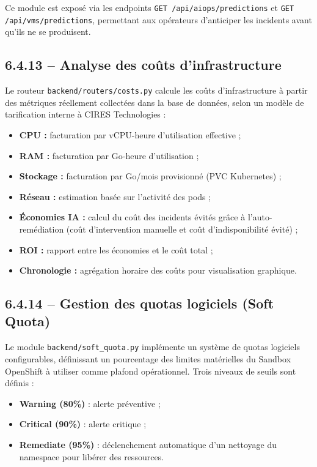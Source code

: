 \documentclass[11pt,a4paper]{report}
\begin{document}
Ce module est exposé via les endpoints \texttt{GET /api/aiops/predictions}
et \texttt{GET /api/vms/predictions}, permettant aux opérateurs d'anticiper
les incidents avant qu'ils ne se produisent.

\subsection*{6.4.13 -- Analyse des coûts d'infrastructure}

Le routeur \texttt{backend/routers/costs.py} calcule les coûts
d'infrastructure à partir des métriques réellement collectées dans la base
de données, selon un modèle de tarification interne à CIRES Technologies :

\begin{itemize}[label=\textbullet, leftmargin=1.5cm, labelsep=0.5cm,
                itemsep=0.1em, parsep=0em, topsep=0.2em]
    \item \textbf{CPU :} facturation par vCPU-heure d'utilisation effective ;
    \item \textbf{RAM :} facturation par Go-heure d'utilisation ;
    \item \textbf{Stockage :} facturation par Go/mois provisionné (PVC
    Kubernetes) ;
    \item \textbf{Réseau :} estimation basée sur l'activité des pods ;
    \item \textbf{Économies IA :} calcul du coût des incidents évités grâce à
    l'auto-remédiation (coût d'intervention manuelle et coût
    d'indisponibilité évité) ;
    \item \textbf{ROI :} rapport entre les économies et le coût total ;
    \item \textbf{Chronologie :} agrégation horaire des coûts pour
    visualisation graphique.
\end{itemize}

\subsection*{6.4.14 -- Gestion des quotas logiciels (Soft Quota)}

Le module \texttt{backend/soft\_quota.py} implémente un système de quotas
logiciels configurables, définissant un pourcentage des limites matérielles
du Sandbox OpenShift à utiliser comme plafond opérationnel. Trois niveaux de
seuils sont définis :

\begin{itemize}[label=\textbullet, leftmargin=1.5cm, labelsep=0.5cm,
                itemsep=0.1em, parsep=0em, topsep=0.2em]
    \item \textbf{Warning (80\%)} : alerte préventive ;
    \item \textbf{Critical (90\%)} : alerte critique ;
    \item \textbf{Remediate (95\%)} : déclenchement automatique d'un
    nettoyage du namespace pour libérer des ressources.
\end{itemize}
\end{document}
